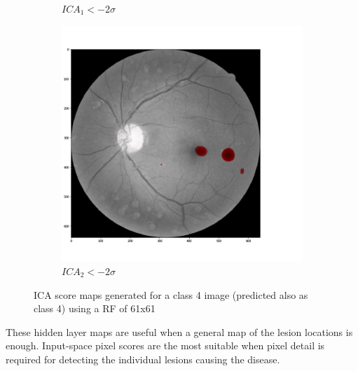\begin{figure}[h!]
\begin{subfigure}[b]{0.32\textwidth}
		\caption{$ICA_1 < - 2 \sigma$}	
	\end{subfigure}
	\begin{subfigure}[b]{0.32\textwidth}
		\centering
		\includegraphics[width=\textwidth]{Figures/chapter_ica/figures/img_t4_p4/rf61/ica2.png}
		\caption{$ICA_2 < - 2 \sigma$}	
	\end{subfigure}
	\hfill 
	\caption[ICA score maps generated for a class 4 image]{ICA score maps generated for a class 4 image (predicted also as class 4) using a RF of 61x61}  
	\label{fig:ica_components_class4} 
\end{figure}

These hidden layer maps are useful when a general map of the lesion locations is enough. Input-space pixel scores are the most suitable when pixel detail is required for detecting the individual lesions causing the disease.


